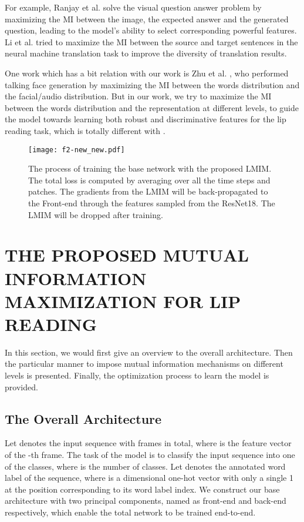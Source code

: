 \documentclass[a4paper, 10pt, conference]{ieeeconf}      \usepackage{FG2020}
\begin{document}
For example, Ranjay et al. \cite{krishna2019information} solve the visual question answer problem by maximizing the MI between the image, the expected answer and the generated question, leading to the model’s ability to select corresponding powerful features. Li et al. \cite{li2016mutual} tried to maximize the MI between the source and target sentences in the neural machine translation task to improve the diversity of translation results.

One work which has a bit relation with our work is Zhu et al. \cite{zhu2018high}, who performed talking face generation by maximizing the MI between the words distribution and the facial/audio distribution. But in our work, we try to maximize the MI between the words distribution and the representation at different levels, to guide the model towards learning both robust and discriminative features for the lip reading task, which is totally different with \cite{zhu2018high}.

   \begin{figure*}
      \centering
      \texttt{[image: f2-new\_new.pdf]}
      \caption{The process of training the base network with the proposed LMIM. The total loss is computed by averaging over all the time steps and patches. The gradients from the LMIM will be back-propagated to the Front-end through the features sampled from the ResNet18. The LMIM will be dropped after training.}
    \label{fig:2}
   \end{figure*} \section{THE PROPOSED MUTUAL INFORMATION MAXIMIZATION FOR LIP READING}
In this section, we would first give an overview to the overall architecture. Then the particular manner to impose mutual information mechanisms on different levels is presented. Finally, the optimization process to learn the model is provided.
\subsection{The Overall Architecture}\label{3.1}
Let  denotes the input sequence with  frames in total, where  is the feature vector of the -th frame. The task of the model is to classify the input sequence  into one of the  classes, where  is the number of classes. Let  denotes the annotated word label of the sequence, where  is a dimensional one-hot vector with only a single 1 at the position corresponding to its word label index. We construct our base architecture with two principal components, named as front-end and back-end respectively, which enable the total network to be trained end-to-end. 
\end{document}
